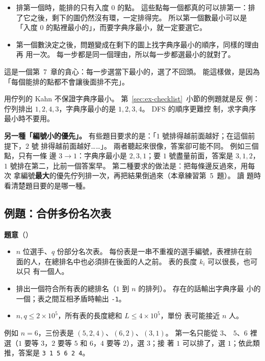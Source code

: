 \begin{itemize}
\item 排第一個時，能排的只有入度 $0$ 的點。 這些點每一個都真的可以排第一：排
了它之後，剩下的圖仍然沒有環，一定排得完。 所以第一個數最小可以是「入度 $0$
的點裡最小的」，而要字典序最小，就一定要選它。
\item 第一個數決定之後，問題變成在剩下的圖上找字典序最小的順序，同樣的理由再
用一次。 每一步都是同一個理由，所以每一步都選最小的就對了。
\end{itemize}

這是一個第~7~章的貪心：每一步選當下最小的，選了不回頭。 能這樣做，是因為
「每個能排的點都不會讓後面排不完」。

用佇列的 Kahn 不保證字典序最小。 第~\ref{sec:ex-checklist}~小節的例題就是反
例：佇列排出 $1, 2, 4, 3$，字典序最小的是 $1, 2, 3, 4$。 DFS 的順序更難控
制，求字典序最小時不要用。

\textbf{另一種「編號小的優先」。} 有些題目要求的是：「$1$ 號排得越前面越好；在這個前提下，$2$ 號
排得越前面越好……」。 兩者聽起來很像，答案卻可能不同。 例如三個點，只有一條
邊 $3 \to 1$：字典序最小是 $2, 3, 1$；要 $1$ 號盡量前面，答案是 $3, 1, 2$，
$1$ 號排在第二，比前一個答案早。 第二種要求的做法是：把每條邊反過來，用每次
拿編號\textbf{最大}的優先佇列排一次，再把結果倒過來（本章練習第~5~題）。 讀
題時看清楚題目要的是哪一種。

\subsection{例題：合併多份名次表}
\label{sec:ex-rankings}

\textbf{題意}（）

\begin{itemize}
\item $n$ 位選手、$q$ 份部分名次表。 每份表是一串不重複的選手編號，表裡排在前
面的人，在總排名中也必須排在後面的人之前。 表的長度 $k_i$ 可以很長，也可以只
有一個人。
\item 排出一個符合所有表的總排名（$1$ 到 $n$ 的排列）。 存在的話輸出字典序最
小的一個；表之間互相矛盾時輸出 \texttt{-1}。
\item $n, q \le 2 \times 10^5$，所有表的長度總和 $L \le 4 \times 10^5$，單份
表可能接近 $n$ 人。
\end{itemize}

例如 $n = 6$，三份表是 $(5, 2, 4)$、$(6, 2)$、$(3, 1)$。 第一名只能從 $3$、
$5$、$6$ 裡選（$1$ 要等 $3$，$2$ 要等 $5$ 和 $6$，$4$ 要等 $2$），選 $3$；接
著 $1$ 可以排了，選 $1$；依此類推，答案是 \texttt{3 1 5 6 2 4}。


